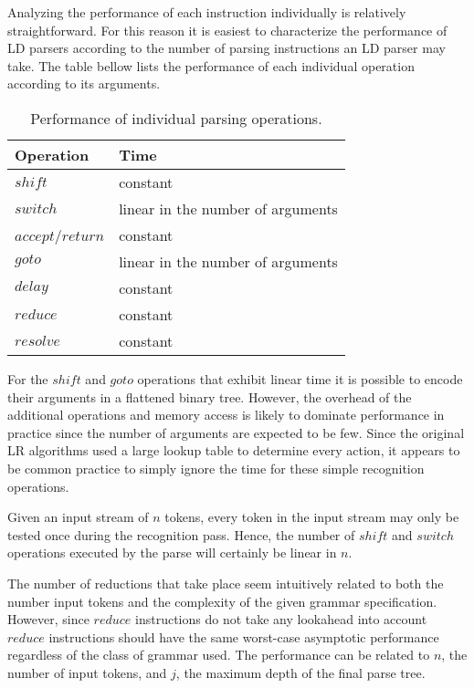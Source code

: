 \documentclass[a4paper,11pt]{article}
\begin{document}
Analyzing the performance of each instruction individually is relatively straightforward. 
For this reason it is easiest to characterize the performance of LD parsers according to the number of parsing instructions an LD parser may take.
The table bellow lists the performance of each individual operation according to its arguments.

\begin{table}[!ht]\begin{center}
  \begin{tabular}{|l|l|}
  \hline
  \textbf{Operation} & \textbf{Time} \\
  \hline
  $shift$            & constant \\ \hline
  $switch$           & linear in the number of arguments \\ \hline
  $accept$/$return$  & constant \\ \hline
  $goto$             & linear in the number of arguments \\ \hline
  $delay$            & constant \\ \hline
  $reduce$           & constant \\ \hline
  $resolve$          & constant \\
  \hline
  \end{tabular}
\caption{Performance of individual parsing operations.}
\end{center}\end{table}

For the $shift$ and $goto$ operations that exhibit linear time it is possible to encode their arguments in a flattened binary tree.
However, the overhead of the additional operations and memory access is likely to dominate performance in practice since the number of arguments are expected to be few.
Since the original LR algorithms used a large lookup table to determine every action, it appears to be common practice to simply ignore the time for these simple recognition operations.

Given an input stream of $n$ tokens, every token in the input stream may only be tested once during the recognition pass.
Hence, the number of $shift$ and $switch$ operations executed by the parse will certainly be linear in $n$.

The number of reductions that take place seem intuitively related to both the number input tokens and the complexity of the given grammar specification.
However, since $reduce$ instructions do not take any lookahead into account $reduce$ instructions should have the same worst-case asymptotic performance regardless of the class of grammar used.
The performance can be related to $n$, the number of input tokens, and $j$, the maximum depth of the final parse tree.
\end{document}
